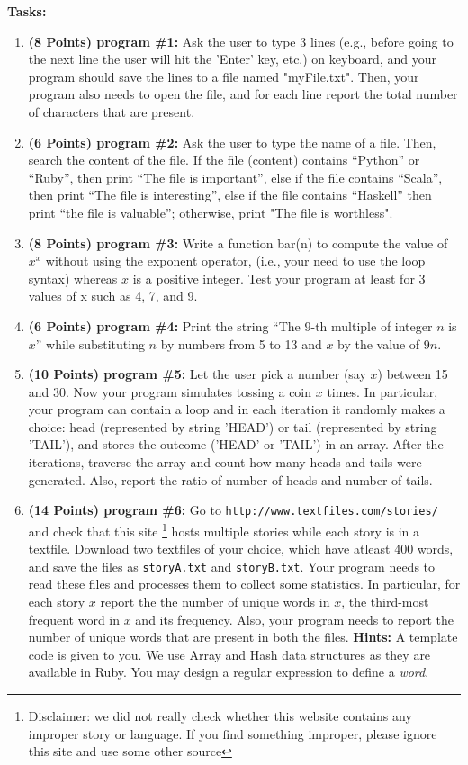 \documentclass[paper=letter, fontsize=11pt]{scrartcl} %
\begin{document}
    \textbf{Tasks:}
    \begin{enumerate}[noitemsep]

        \item \textbf{(8 Points) program \#1:} Ask the user to type 3 lines 
(e.g., before going to the next line the user will hit the 'Enter' key, etc.) 
on keyboard, and your program should save the lines to a file named "myFile.txt". 
Then, your program also needs to open the file, and for each line report the total number of characters that are present.
        \item \textbf{(6 Points) program \#2:} Ask the user to type the name of a file. 
Then, search the content of the file. 
If the file (content) contains 
``Python'' or ``Ruby'', then print ``The file is important'', else if the file contains ``Scala'', 
then print ``The file is interesting'', else if the file contains ``Haskell'' then print ``the file is valuable''; 
otherwise, print "The file is worthless". 

        \item \textbf{(8 Points) program \#3:} Write a function bar(n) to compute the value of $x^x$ without 
using the exponent operator, (i.e., your need to use the loop syntax) whereas $x$ is a positive integer. 
Test your program at least for 3 values of x such as 4, 7, and 9.

        \item \textbf{(6 Points) program \#4:} Print the string ``The $9$-th multiple of integer $n$ is $x$'' 
while substituting $n$ by numbers from 5 to 13 and $x$ by the value of $9n$.
        \item \textbf{(10 Points) program \#5:} Let the user pick a number (say $x$) between 15 and 30. 
Now your program simulates tossing a coin $x$ times. 
In particular, your program can contain a loop and in each iteration it randomly makes a choice: 
head (represented by string 'HEAD') or 
tail (represented by string 'TAIL'), and stores the outcome ('HEAD' or 'TAIL') 
in an array. After the iterations, traverse the array and count how many heads and tails were generated. 
Also, report the ratio of number of heads and number of tails.

        \item \textbf{(14 Points) program \#6:} Go to \texttt{http://www.textfiles.com/stories/} and check that this site 
\footnote {Disclaimer: we did not really check whether this website contains any improper story or language. 
If you find something improper, please ignore this site and use some other source} hosts multiple stories 
while each story is in a textfile. Download two textfiles of your choice, which have atleast 400 words, 
and save the files as \texttt{storyA.txt} and \texttt{storyB.txt}. Your program needs to read these files and processes 
them to collect some statistics. In particular, for each story $x$ report the the number of unique words in $x$, 
the third-most frequent word in $x$ and its frequency. Also, your program needs to report the number of unique words that are present in both the files.
\textbf {Hints:} A template code is given to you. We use Array and Hash data structures as they are available in Ruby. You may design a regular expression to define a \emph{word}.  


\end{enumerate}
\end{document}
